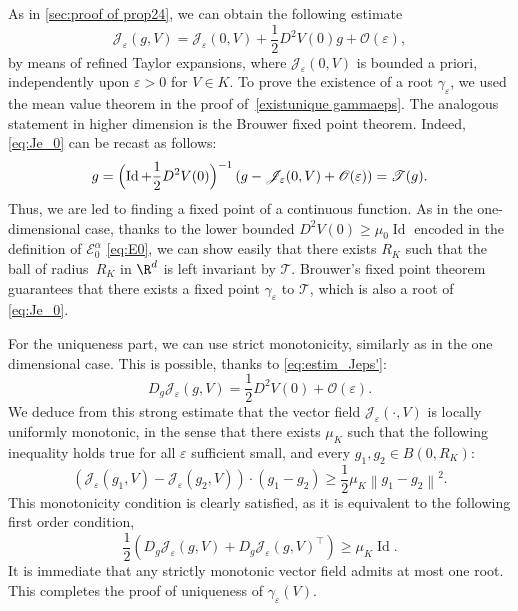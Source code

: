\documentclass[10pt]{amsart}
\let\mathcal\mathscr
\newcommand{\cO}{\mathcal{O}}
\newcommand{\cT}{\mathcal{T}}
\theoremstyle{plain}
\theoremstyle{definition}
\newcommand{\Je}{\mathcal{J}_\eps}
\let\eps\varepsilon
\newcommand{\norm}[1]{\left\lVert#1\right\rVert}
\newcommand{\Eaz}{\mathcal{E}^\alpha_0}
\DeclareMathOperator{\Id}{Id}
\begin{document}
As in \cref{sec:proof of prop24}, we can obtain the following estimate
\begin{equation}\label{eq:prep brouwer}
\Je(g,V) = \Je(0,V) + \frac12 D^2 V(0) g + \cO(\eps),
\end{equation}
by means of refined Taylor expansions, where $\Je(0,V)$ is bounded a priori, independently upon $\eps>0$ for $V\in K$. To prove the existence of a root $\gamma_\eps$, we used the mean value theorem in the proof of~\cref{existunique gammaeps}. The analogous statement in higher dimension is the Brouwer fixed point theorem. Indeed, \eqref{eq:Je_0} can be recast as follows:
\begin{align*}
g = \Bigl (\Id + \dfrac{1}{2} D^2 V(0) \Bigr)^{-1}\left (g - \Je(0,V) + \cO(\eps)\right) = \cT(g).
\end{align*}
Thus, we are led to finding a fixed point of a continuous function. As in the one-dimensional case, thanks to the lower bounded $D^2V(0) \geq \mu_0 \Id$ encoded in the definition of $\Eaz$ \eqref{eq:E0}, we can show easily that there exists $R_K$ such that the ball of radius~$R_K$ in $\R^d$ is left invariant by $\cT$.
Brouwer's fixed point theorem guarantees that there exists a fixed point $\gamma_\eps$ to $\cT$, which is also a root of \eqref{eq:Je_0}.

For the uniqueness part, we can use strict monotonicity, similarly as in the one dimensional case. This is possible, thanks to \eqref{eq:estim_Jeps'}:
\begin{equation}\label{eq:pJe_approx}
D_g \Je(g,V) =\frac12 D^2 V(0) + \cO(\eps).
\end{equation}
We deduce from this strong estimate that the vector field $\Je(\cdot,V)$ is locally uniformly monotonic, in the sense that there exists $\mu_K$ such that the following inequality holds true for all $\eps$ sufficient small, and every $g_1,g_2\in B(0,R_K)$:
\begin{equation}\label{eq:cond posvectorfield}
\left(\Je(g_1,V)-\Je(g_2,V)\right) \cdot(g_1-g_2)\geq \frac12 \mu_K \norm{g_1-g_2}^2.
\end{equation}
This monotonicity condition is clearly satisfied, as it is equivalent to the following first order condition,
\begin{equation}\label{eq:jacob pos}
\dfrac{1}{2} \left(D_g \Je(g,V) + D_g \Je(g,V)^\top \right) \geq \mu_K \Id.
\end{equation}
It is immediate that any strictly monotonic vector field admits at most one root. This completes the proof of uniqueness of $\gamma_\eps(V)$.
\end{document}

